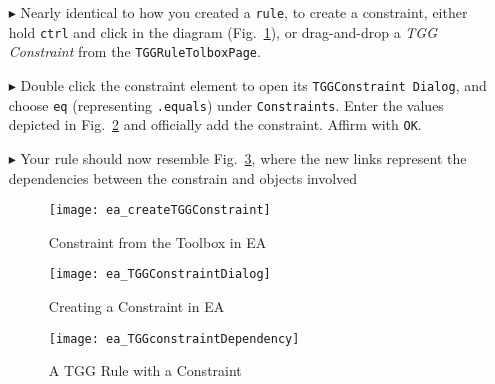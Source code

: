 \begin{enumerate}
  \item[$\blacktriangleright$] Nearly identical to how you created a \texttt{rule}, to create a constraint, either hold \texttt{ctrl} and click in
  the diagram (Fig.~\ref{fig:common_toolbox}), or drag-and-drop a \emph{TGG Constraint} from the \texttt{TGGRuleTolboxPage}.

\vspace{0.5cm}

\item[$\blacktriangleright$] Double click the constraint element to open its \texttt{TGGConstraint Dialog}, and choose \texttt{eq} (representing
\texttt{.equals}) under \texttt{Constraints}. Enter the values depicted in Fig.~\ref{fig:first_tgg_constraint} and officially add the constraint. Affirm with
\texttt{OK}.

\vspace{0.5cm}

\item[$\blacktriangleright$] Your rule should now resemble Fig.~\ref{fig:tgg_rule_with_constraint}, where the new links represent the dependencies between the
  constrain and objects involved

\newpage 

\begin{figure}[htbp]
\begin{center}
  \texttt{[image: ea\_createTGGConstraint]}
  \caption{Constraint from the Toolbox in EA}
  \label{fig:common_toolbox}
\end{center}
\end{figure}

\vspace{0.5cm}

\begin{figure}[htbp]
\begin{center}
  \texttt{[image: ea\_TGGConstraintDialog]}
  \caption{Creating a Constraint in EA}
  \label{fig:first_tgg_constraint}
\end{center}
\end{figure}

\vspace{0.5cm}

\begin{figure}[h!]
\begin{center}
  \texttt{[image: ea\_TGGconstraintDependency]}
  \caption{A TGG Rule with a Constraint}
  \label{fig:tgg_rule_with_constraint}
  \end{center}
\end{figure}


\end{enumerate}
